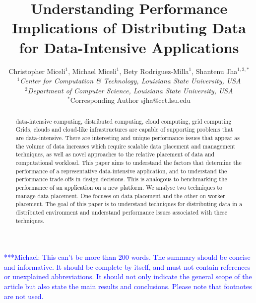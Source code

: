 \documentclass{rspublic}
\title[Understanding Performance Implications of Distributing Data for
Data-Intensive Applications]{Understanding Performance Implications of
Distributing Data for Data-Intensive Applications}
\author[Miceli, Miceli, Rodriguez-Milla, Jha]{ Christopher Miceli$^{1}$,
Michael Miceli$^{1}$, Bety Rodriguez-Milla$^{1}$, Shantenu Jha$^{1,2,*}$ \\
\small{\emph{$^{1}$Center for Computation \& Technology, Louisiana State
University, USA}} \\  \small{\emph{$^{2}$Department of Computer Science,
Louisiana State University, USA}} \\ {\footnotesize {\hspace{0.0 in}
$^*$Corresponding Author sjha@cct.lsu.edu}} }
\newcommand{\micnote}[1]{ {\textcolor{blue} { ***Michael: #1 }}}
\begin{document}
 \maketitle

\micnote{This can't be more than 200 words. The summary should be
concise and informative. It should be complete by itself, and must not
contain references or unexplained abbreviations. It should not only
indicate the general scope of the article but also state the main
results and conclusions. Please note that footnotes are not used.}

\begin{abstract}{data-intensive computing, distributed computing,
    cloud computing, grid computing} 
Grids, clouds and cloud-like infrastructures are capable of supporting
problems that are data-intensive. There are interesting and unique
performance issues that appear as the volume of data increases which
require scalable data placement and management techniques, as well as
novel approaches to the relative placement of data and computational
workload.  This paper aims to understand the factors that
determine the performance of a representative data-intensive
application, and to understand the performance trade-offs in design
decisions. This is analogous to benchmarking the performance of an
application on a new platform. We analyse two techniques to manage data
placement. One focuses on data placement and the other on worker
placement. The goal of this paper is to understand techniques for
distributing data in a distributed environment and understand
performance issues associated with these techniques.
\end{abstract}

\end{document}
